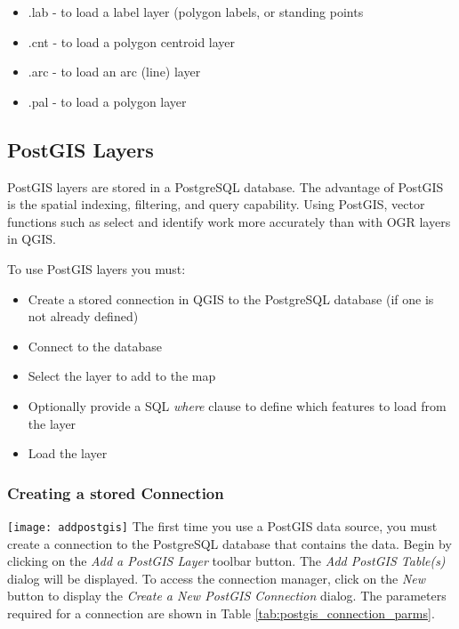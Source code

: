 \begin{itemize}
\item .lab - to load a label layer (polygon labels, or standing points
\item .cnt - to load a polygon centroid layer 
\item .arc - to load an arc (line) layer
\item .pal - to load a polygon layer
\end{itemize}

\subsection{PostGIS Layers}
\label{label_postgis} 

PostGIS layers are stored in a PostgreSQL database. The advantage of PostGIS
is the spatial indexing, filtering, and query capability. Using PostGIS,
vector functions such as select and identify work more accurately than with
OGR layers in QGIS.

To use PostGIS layers you must:

\begin{itemize}
\item Create a stored connection in QGIS to the PostgreSQL database (if one is
not already defined)
\item Connect to the database
\item Select the layer to add to the map
\item Optionally provide a SQL \textit{where} clause to define which features
to load from the layer
\item Load the layer
\end{itemize}

\subsubsection{Creating a stored
Connection}\label{sec:postgis_stored}

\texttt{[image: addpostgis]} The first time
you use a PostGIS data source, you must create a connection to the PostgreSQL
database that contains the data. Begin by clicking on the \textit{Add a
PostGIS Layer} toolbar button. The \textsl{Add PostGIS Table(s)} dialog will
be displayed. To access the connection manager, click on the \textsl{New} button to display the \textsl{Create a New
PostGIS Connection} dialog. The parameters required for a connection are shown
in Table \ref{tab:postgis_connection_parms}.

